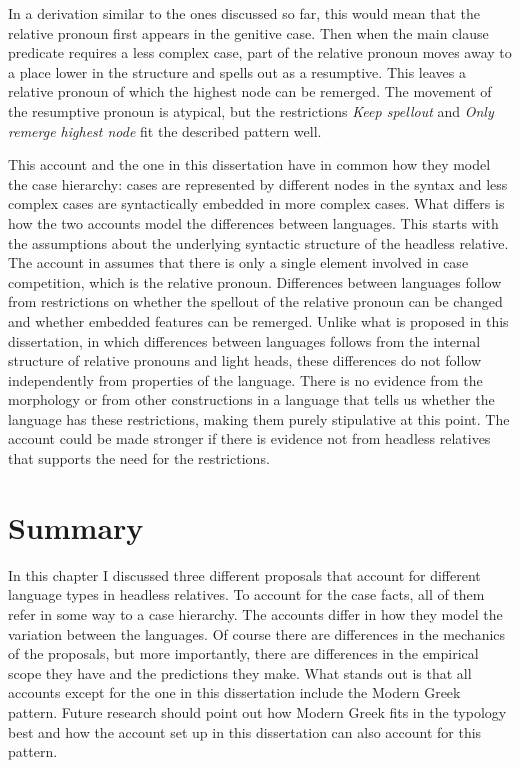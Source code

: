 In a derivation similar to the ones discussed so far, this would mean that the relative pronoun first appears in the genitive case. Then when the main clause predicate requires a less complex case, part of the relative pronoun moves away to a place lower in the structure and spells out as a resumptive. This leaves a relative pronoun of which the highest node can be remerged. The movement of the resumptive pronoun is atypical, but the restrictions \textit{Keep spellout} and \textit{Only remerge highest node} fit the described pattern well.

This account and the one in this dissertation have in common how they model the case hierarchy: cases are represented by different nodes in the syntax and less complex cases are syntactically embedded in more complex cases. What differs is how the two accounts model the differences between languages. This starts with the assumptions about the underlying syntactic structure of the headless relative. The account in \citealt{bergsma2019} assumes that there is only a single element involved in case competition, which is the relative pronoun. Differences between languages follow from restrictions on whether the spellout of the relative pronoun can be changed and whether embedded features can be remerged. Unlike what is proposed in this dissertation, in which differences between languages follows from the internal structure of relative pronouns and light heads, these differences do not follow independently from properties of the language. There is no evidence from the morphology or from other constructions in a language that tells us whether the language has these restrictions, making them purely stipulative at this point. The account could be made stronger if there is evidence not from headless relatives that supports the need for the restrictions.


\section{Summary}

In this chapter I discussed three different proposals that account for different language types in headless relatives.
To account for the case facts, all of them refer in some way to a case hierarchy.
The accounts differ in how they model the variation between the languages. Of course there are differences in the mechanics of the proposals, but more importantly, there are differences in the empirical scope they have and the predictions they make.
What stands out is that all accounts except for the one in this dissertation include the Modern Greek pattern. Future research should point out how Modern Greek fits in the typology best and how the account set up in this dissertation can also account for this pattern.